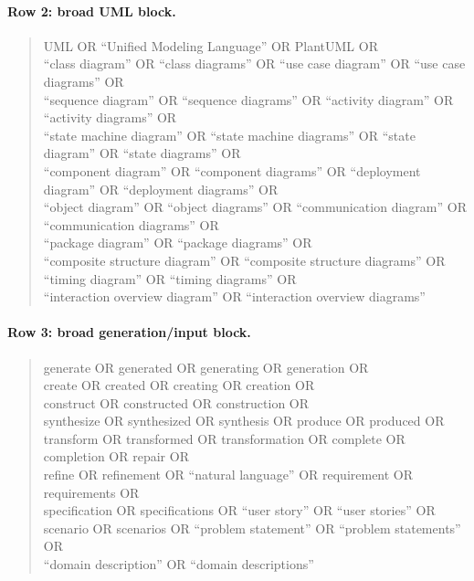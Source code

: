 \paragraph{Row 2: broad UML block.}

\begin{quote}
\begin{minipage}{0.96\textwidth}
\scriptsize\ttfamily\raggedright
UML OR ``Unified Modeling Language'' OR PlantUML OR\\
``class diagram'' OR ``class diagrams'' OR ``use case diagram'' OR ``use case diagrams'' OR\\
``sequence diagram'' OR ``sequence diagrams'' OR ``activity diagram'' OR ``activity diagrams'' OR\\
``state machine diagram'' OR ``state machine diagrams'' OR ``state diagram'' OR ``state diagrams'' OR\\
``component diagram'' OR ``component diagrams'' OR ``deployment diagram'' OR ``deployment diagrams'' OR\\
``object diagram'' OR ``object diagrams'' OR ``communication diagram'' OR ``communication diagrams'' OR\\
``package diagram'' OR ``package diagrams'' OR\\
``composite structure diagram'' OR ``composite structure diagrams'' OR\\
``timing diagram'' OR ``timing diagrams'' OR\\
``interaction overview diagram'' OR ``interaction overview diagrams''
\end{minipage}
\end{quote}

\paragraph{Row 3: broad generation/input block.}

\begin{quote}
\begin{minipage}{0.96\textwidth}
\scriptsize\ttfamily\raggedright
generate OR generated OR generating OR generation OR\\
create OR created OR creating OR creation OR\\
construct OR constructed OR construction OR\\
synthesize OR synthesized OR synthesis OR produce OR produced OR\\
transform OR transformed OR transformation OR complete OR completion OR repair OR\\
refine OR refinement OR ``natural language'' OR requirement OR requirements OR\\
specification OR specifications OR ``user story'' OR ``user stories'' OR\\
scenario OR scenarios OR ``problem statement'' OR ``problem statements'' OR\\
``domain description'' OR ``domain descriptions''
\end{minipage}
\end{quote}

